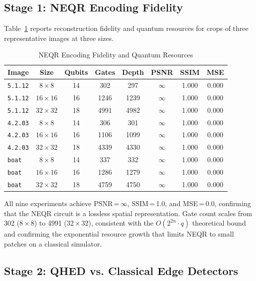 \documentclass[journal]{IEEEtran}
\begin{document}
\subsection{Stage 1: NEQR Encoding Fidelity}

Table~\ref{tab:neqr} reports reconstruction fidelity and quantum resources
for crops of three representative images at three sizes.

\begin{table}[!t]
\renewcommand{\arraystretch}{1.2}
\caption{NEQR Encoding Fidelity and Quantum Resources}
\label{tab:neqr}
\centering
\begin{tabular}{lccccccc}
\toprule
Image & Size & Qubits & Gates & Depth & PSNR & SSIM & MSE \\
\midrule
\texttt{5.1.12} & $8{\times}8$   & 14 & 302   & 297  & $\infty$ & 1.000 & 0.000 \\
\texttt{5.1.12} & $16{\times}16$ & 16 & 1246  & 1239 & $\infty$ & 1.000 & 0.000 \\
\texttt{5.1.12} & $32{\times}32$ & 18 & 4991  & 4982 & $\infty$ & 1.000 & 0.000 \\
\texttt{4.2.03} & $8{\times}8$   & 14 & 306   & 301  & $\infty$ & 1.000 & 0.000 \\
\texttt{4.2.03} & $16{\times}16$ & 16 & 1106  & 1099 & $\infty$ & 1.000 & 0.000 \\
\texttt{4.2.03} & $32{\times}32$ & 18 & 4339  & 4330 & $\infty$ & 1.000 & 0.000 \\
\texttt{boat}   & $8{\times}8$   & 14 & 337   & 332  & $\infty$ & 1.000 & 0.000 \\
\texttt{boat}   & $16{\times}16$ & 16 & 1286  & 1279 & $\infty$ & 1.000 & 0.000 \\
\texttt{boat}   & $32{\times}32$ & 18 & 4759  & 4750 & $\infty$ & 1.000 & 0.000 \\
\bottomrule
\end{tabular}
\end{table}

All nine experiments achieve PSNR\,=\,$\infty$, SSIM\,=\,1.0, and
MSE\,=\,0.0, confirming that the NEQR circuit is a lossless spatial
representation.  Gate count scales from 302 (8\,$\times$\,8) to 4991
(32\,$\times$\,32), consistent with the $O(2^{2n}\cdot q)$ theoretical bound
and confirming the exponential resource growth that limits NEQR to small
patches on a classical simulator.

\subsection{Stage 2: QHED vs. Classical Edge Detectors}
\end{document}
